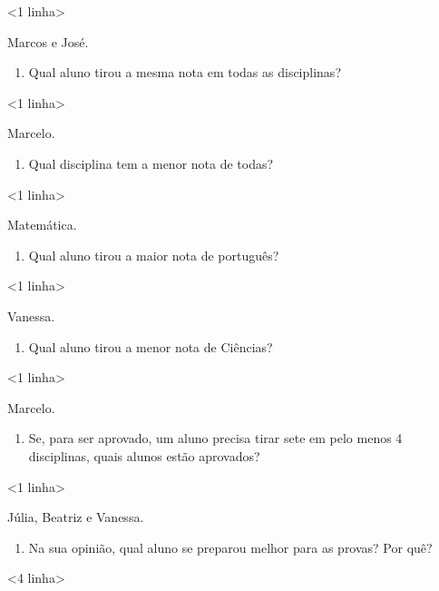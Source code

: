 {{{{{{{{{{{{{{{{{\textless{}1 linha\textgreater{}

Marcos e José.

\begin{enumerate}
\def\labelenumi{\alph{enumi})}
\item
  Qual aluno tirou a mesma nota em todas as disciplinas?
\end{enumerate}

\textless{}1 linha\textgreater{}

Marcelo.

\begin{enumerate}
\def\labelenumi{\alph{enumi})}
\item
  Qual disciplina tem a menor nota de todas?
\end{enumerate}

\textless{}1 linha\textgreater{}

Matemática.

\begin{enumerate}
\def\labelenumi{\alph{enumi})}
\item
  Qual aluno tirou a maior nota de português?
\end{enumerate}

\textless{}1 linha\textgreater{}

Vanessa.

\begin{enumerate}
\def\labelenumi{\alph{enumi})}
\item
  Qual aluno tirou a menor nota de Ciências?
\end{enumerate}

\textless{}1 linha\textgreater{}

Marcelo.

\begin{enumerate}
\def\labelenumi{\alph{enumi})}
\item
  Se, para ser aprovado, um aluno precisa tirar sete em pelo menos 4
  disciplinas, quais alunos estão aprovados?
\end{enumerate}

\textless{}1 linha\textgreater{}

Júlia, Beatriz e Vanessa.

\begin{enumerate}
\def\labelenumi{\alph{enumi})}
\item
  Na sua opinião, qual aluno se preparou melhor para as provas? Por quê?
\end{enumerate}

\textless{}4 linha\textgreater{}

}}}}}}}}}}}}}}}}}
